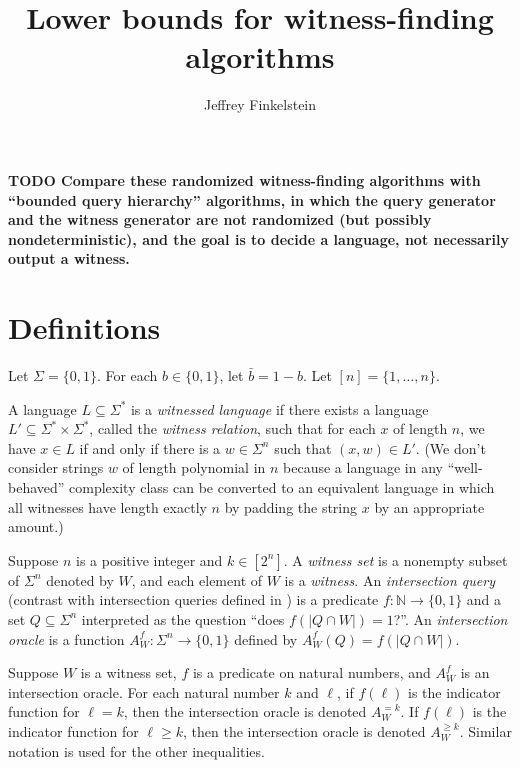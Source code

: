 \documentclass{article}
\title{Lower bounds for witness-finding algorithms}
\author{Jeffrey Finkelstein}
\newcommand{\todo}[1]{\textbf{TODO #1}}
\begin{document}
\maketitle


\todo{Compare these randomized witness-finding algorithms with ``bounded query hierarchy'' algorithms, in which the query generator and the witness generator are not randomized (but possibly nondeterministic), and the goal is to decide a language, not necessarily output a witness.}

\section{Definitions}

Let $\Sigma = \{0, 1\}$.
For each $b \in \{0, 1\}$, let $\bar{b} = 1 - b$.
Let $[n] = \{1, \dotsc, n\}$.

A language $L \subseteq \Sigma^*$ is a \emph{witnessed language} if there exists a language $L' \subseteq \Sigma^* \times \Sigma^*$, called the \emph{witness relation}, such that for each $x$ of length $n$, we have $x \in L$ if and only if there is a $w \in \Sigma^n$ such that $(x, w) \in L'$.
(We don't consider strings $w$ of length polynomial in $n$ because a language in any ``well-behaved'' complexity class can be converted to an equivalent language in which all witnesses have length exactly $n$ by padding the string $x$ by an appropriate amount.)

\begin{definition}
  Suppose $n$ is a positive integer and $k \in [2^n]$.
  A \emph{witness set} is a nonempty subset of $\Sigma^n$ denoted by $W$, and each element of $W$ is a \emph{witness}.
  An \emph{intersection query} (contrast with intersection queries defined in \autocite{krw14}) is a predicate $f \colon \mathbb{N} \to \{0, 1\}$ and a set $Q \subseteq \Sigma^n$ interpreted as the question ``does $f(|Q \cap W|) = 1$?''.
  An \emph{intersection oracle} is a function $A^f_W \colon \Sigma^n \to \{0, 1\}$ defined by $A^f_W(Q) = f(|Q \cap W|)$.
\end{definition}

\begin{definition}
  Suppose $W$ is a witness set, $f$ is a predicate on natural numbers, and $A^f_W$ is an intersection oracle.
  For each natural number $k$ and $\ell$, if $f(\ell)$ is the indicator function for $\ell = k$, then the intersection oracle is denoted $A^{=k}_W$.
  If $f(\ell)$ is the indicator function for $\ell \geq k$, then the intersection oracle is denoted $A^{\geq k}_W$.
  Similar notation is used for the other inequalities.
\end{definition}
\end{document}
